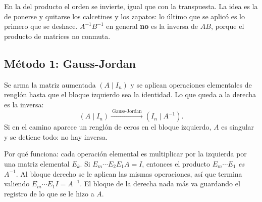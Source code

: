 \documentclass[11pt,letterpaper]{article}
\begin{document}
\begin{ojo}
    En la del producto el orden se invierte, igual que con la
    transpuesta. La idea es la de ponerse y quitarse los calcetines y
    los zapatos: lo último que se aplicó es lo primero que se deshace.
    $A^{-1}B^{-1}$ en general \textbf{no} es la inversa de $AB$,
    porque el producto de matrices no conmuta.
\end{ojo}


\subsection*{Método 1: Gauss-Jordan}

Se arma la matriz aumentada $(A \mid I_n)$ y se aplican operaciones
elementales de renglón hasta que el bloque izquierdo sea la identidad.
Lo que queda a la derecha es la inversa:
\[
    (A \mid I_n) \xrightarrow{\ \text{Gauss-Jordan}\ } (I_n \mid A^{-1}) .
\]
Si en el camino aparece un renglón de ceros en el bloque izquierdo, $A$
es singular y se detiene todo: no hay inversa.

\begin{idea}
    Por qué funciona: cada operación elemental es multiplicar por la
    izquierda por una matriz elemental $E_k$. Si
    $E_m \cdots E_2 E_1 A = I$, entonces el producto
    $E_m \cdots E_1$ \emph{es} $A^{-1}$. Al bloque derecho se le
    aplican las mismas operaciones, así que termina valiendo
    $E_m \cdots E_1 I = A^{-1}$. El bloque de la derecha nada más va
    guardando el registro de lo que se le hizo a $A$.
\end{idea}
\end{document}
